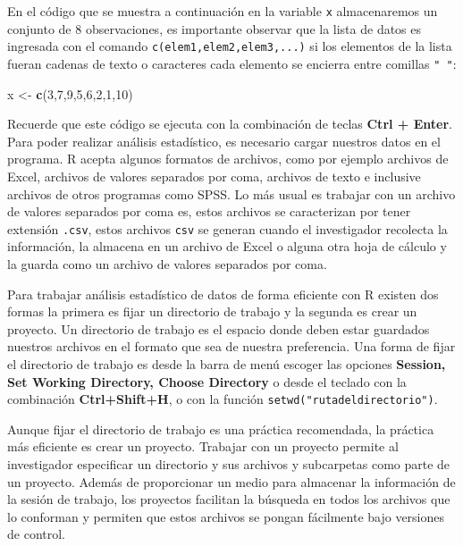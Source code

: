 \documentclass[
]{krantz}
\makeatletter
\newenvironment{Shaded}{\begin{snugshade}}{\end{snugshade}}
\newcommand{\DecValTok}[1]{\textcolor[rgb]{0.06,0.06,0.06}{#1}}
\newcommand{\KeywordTok}[1]{\textcolor[rgb]{0.27,0.27,0.27}{\textbf{#1}}}
\newcommand{\NormalTok}[1]{#1}
\newcommand{\StringTok}[1]{\textcolor[rgb]{0.5,0.5,0.5}{#1}}
\newenvironment{kframe}{%
\medskip{}
\setlength{\fboxsep}{.8em}
 \def\at@end@of@kframe{}%
 \ifinner\ifhmode%
  \def\at@end@of@kframe{\end{minipage}}%
  \begin{minipage}{\columnwidth}%
 \fi\fi%
 \def\FrameCommand##1{\hskip\@totalleftmargin \hskip-\fboxsep
 \colorbox{shadecolor}{##1}\hskip-\fboxsep
     \hskip-\linewidth \hskip-\@totalleftmargin \hskip\columnwidth}%
 \MakeFramed {\advance\hsize-\width
   \@totalleftmargin\z@ \linewidth\hsize
   \@setminipage}}%
 {\par\unskip\endMakeFramed%
 \at@end@of@kframe}
\renewenvironment{Shaded}{\begin{kframe}}{\end{kframe}}
\makeatother
\begin{document}
En el código que se muestra a continuación en la variable \texttt{x} almacenaremos un conjunto de 8 observaciones, es importante observar que la lista de datos es ingresada con el comando \texttt{c(elem1,elem2,elem3,...)} si los elementos de la lista fueran cadenas de texto o caracteres cada elemento se encierra entre comillas \texttt{"\ "}:

\begin{Shaded}
\begin{Highlighting}[]
\NormalTok{x <-}\StringTok{ }\KeywordTok{c}\NormalTok{(}\DecValTok{3}\NormalTok{,}\DecValTok{7}\NormalTok{,}\DecValTok{9}\NormalTok{,}\DecValTok{5}\NormalTok{,}\DecValTok{6}\NormalTok{,}\DecValTok{2}\NormalTok{,}\DecValTok{1}\NormalTok{,}\DecValTok{10}\NormalTok{) }
\end{Highlighting}
\end{Shaded}

Recuerde que este código se ejecuta con la combinación de teclas \textbf{Ctrl + Enter}. Para poder realizar análisis estadístico, es necesario cargar nuestros datos en el programa. R acepta algunos formatos de archivos, como por ejemplo archivos de Excel, archivos de valores separados por coma, archivos de texto e inclusive archivos de otros programas como SPSS. Lo más usual es trabajar con un archivo de valores separados por coma es, estos archivos se caracterizan por tener extensión \texttt{.csv}, estos archivos \texttt{csv} se generan cuando el investigador recolecta la información, la almacena en un archivo de Excel o alguna otra hoja de cálculo y la guarda como un archivo de valores separados por coma.

Para trabajar análisis estadístico de datos de forma eficiente con R existen dos formas la primera es fijar un directorio de trabajo y la segunda es crear un proyecto. Un directorio de trabajo es el espacio donde deben estar guardados nuestros archivos en el formato que sea de nuestra preferencia. Una forma de fijar el directorio de trabajo es desde la barra de menú escoger las opciones \textbf{Session, Set Working Directory, Choose Directory} o desde el teclado con la combinación \textbf{Ctrl+Shift+H}, o con la función \texttt{setwd("rutadeldirectorio")}.

Aunque fijar el directorio de trabajo es una práctica recomendada, la práctica más eficiente es crear un proyecto. Trabajar con un proyecto permite al investigador especificar un directorio y sus archivos y subcarpetas como parte de un proyecto. Además de proporcionar un medio para almacenar la información de la sesión de trabajo, los proyectos facilitan la búsqueda en todos los archivos que lo conforman y permiten que estos archivos se pongan fácilmente bajo versiones de control.
\end{document}
